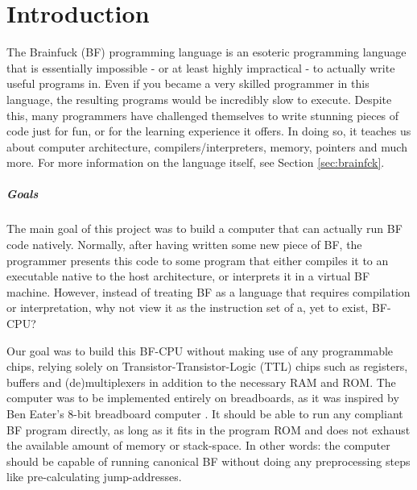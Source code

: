 \chapter{Introduction} \label{sec:introduction}
The Brainfuck (BF) programming language is an esoteric programming language that is essentially impossible - or at least highly impractical - to actually write useful programs in. Even if you became a very skilled programmer in this language, the resulting programs would be incredibly slow to execute. Despite this, many programmers have challenged themselves to write stunning pieces of code just for fun, or for the learning experience it offers. In doing so, it teaches us about computer architecture, compilers/interpreters, memory, pointers and much more. For more information on the language itself, see Section \ref{sec:brainfck}.

\paragraph{Goals} The main goal of this project was to build a computer that can actually run BF code natively. Normally, after having written some new piece of BF, the programmer presents this code to some program that either compiles it to an executable native to the host architecture, or interprets it in a virtual BF machine. However, instead of treating BF as a language that requires compilation or interpretation, why not view it as the instruction set of a, yet to exist, BF-CPU?

Our goal was to build this BF-CPU without making use of any programmable chips, relying solely on Transistor-Transistor-Logic (TTL) chips such as registers, buffers and (de)multiplexers in addition to the necessary RAM and ROM. The computer was to be implemented entirely on breadboards, as it was inspired by Ben Eater's 8-bit breadboard computer \cite{beneater}. It should be able to run any compliant BF program directly, as long as it fits in the program ROM and does not exhaust the available amount of memory or stack-space. In other words: the computer should be capable of running canonical BF without doing any preprocessing steps like pre-calculating jump-addresses.

